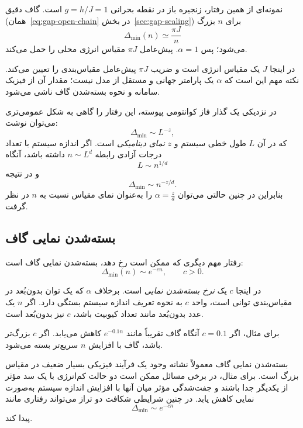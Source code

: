 نمونه‌ای از همین رفتار، زنجیره باز  در نقطه بحرانی $g=h/J=1$ است.
گاف دقیق (همان~\eqref{eq:gap-open-chain} در بخش~\ref{sec:gap-scaling}) برای $n$ بزرگ
\begin{equation}
	\Delta_{\min}(n)
	\simeq
	\frac{\pi J}{n}
	\label{eq:tfim-critical-gap}
\end{equation}
می‌شود؛ پس $\alpha=1$. پیش‌عامل $\pi J$ مقیاس انرژی محلی را حمل می‌کند.

در اینجا $J$ یک مقیاس انرژی است و ضریب $\pi J$ پیش‌عامل مقیاس‌بندی را تعیین می‌کند. نکته مهم این است که $\alpha$ یک پارامتر جهانی و مستقل از مدل نیست؛ مقدار آن از فیزیک سامانه و
نحوه بسته‌شدن گاف ناشی می‌شود.

در نزدیکی یک گذار فاز کوانتومی پیوسته، این رفتار را گاهی به شکل عمومی‌تری می‌توان نوشت:
\begin{equation}
	\Delta_{\min}
	\sim
	L^{-z},
\end{equation}
که در آن $L$ طول خطی سیستم و $z$ \textit{نمای دینامیکی} است. اگر اندازه سیستم با تعداد درجات آزادی رابطه
$n\sim L^d$ داشته باشد، آنگاه
\begin{equation}
	L\sim n^{1/d}
\end{equation}
و در نتیجه
\begin{equation}
	\Delta_{\min}
	\sim
	n^{-z/d}.
\end{equation}
بنابراین در چنین حالتی می‌توان
$\alpha=\frac{z}{d}$
را به‌عنوان نمای مقیاس نسبت به $n$ در نظر گرفت.

\subsection{بسته‌شدن نمایی گاف}

رفتار مهم دیگری که ممکن است رخ دهد، بسته‌شدن نمایی گاف است:
\begin{equation}
	\Delta_{\min}(n)
	\sim
	e^{-cn},
	\qquad
	c>0.
	\label{eq:exponential-gap-closing}
\end{equation}

در اینجا $c$ یک \textit{نرخ بسته‌شدن نمایی} است. برخلاف $\alpha$ که یک توان بدون‌بُعد در مقیاس‌بندی توانی است، واحد $c$ به نحوه تعریف اندازه سیستم بستگی دارد. اگر $n$ یک عدد بدون‌بُعد مانند تعداد کیوبیت باشد، $c$ نیز بدون‌بُعد است.

برای مثال، اگر
$c=0.1$
آنگاه گاف تقریباً مانند $e^{-0.1n}$ کاهش می‌یابد. اگر $c$ بزرگ‌تر باشد، گاف با افزایش $n$ سریع‌تر بسته می‌شود.

بسته‌شدن نمایی گاف معمولاً نشانه وجود یک فرآیند فیزیکی بسیار ضعیف در مقیاس بزرگ است. برای مثال، در برخی مسائل ممکن است دو حالت کم‌انرژی با یک سد مؤثر از یکدیگر جدا باشند و جفت‌شدگی مؤثر میان آنها با افزایش اندازه سیستم به‌صورت نمایی کاهش یابد. در چنین شرایطی شکافت دو تراز می‌تواند رفتاری مانند
\begin{equation}
	\Delta_{\min}\sim e^{-cn}
\end{equation}
پیدا کند.

